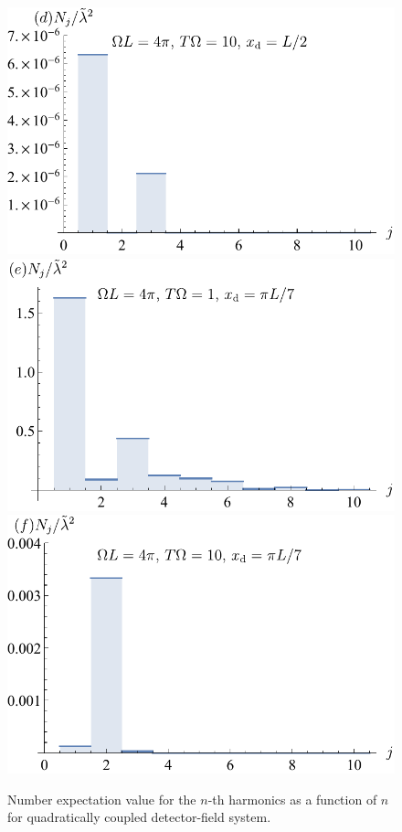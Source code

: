 \documentclass[11pt,prd,onecolumn,superscriptaddress,nofootinbib,floatfix,amsmath,amssymb]{revtex4-2}
\begin{document}
\begin{figure}[tp]
        \includegraphics[scale=0.5]{Fig8d.pdf}
        \includegraphics[scale=0.5]{Fig8e.pdf}
        \includegraphics[scale=0.5]{Fig8f.pdf} \caption{Number expectation value for the $n$-th harmonics as a function of $n$ for quadratically coupled detector-field system. }
        \label{fig: quadraticdeposit1}
    \end{figure} 
        
\end{document}
